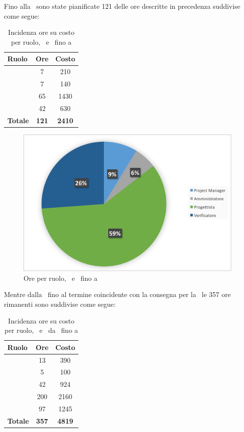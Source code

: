 \newpage
Fino alla \RP\ sono state pianificate 121 delle ore descritte in precedenza suddivise come segue:
\begin{table}[h]
	\begin{center}
		\begin{tabular}{|l|c|c|}
			\hline
			\textbf{Ruolo}	& \textbf{Ore} &	\textbf{Costo}	\\
			\hline
			\Pm &	7 & 210\\
			\hline
			\Am	&	7 & 140\\
			\hline
			\Prog	&	65 & 1430\\
			\hline
			\Ver	&	42 & 630\\
			\hline
			\textbf{Totale} &	 \textbf{121}	&	\textbf{2410}\\
			\hline
		\end{tabular}
	\end{center}
	\caption{Incidenza ore su costo per ruolo, \PD\ e \COD\ fino a \RP}
\end{table}

\begin{figure}[H]
	\centering 
	\includegraphics[scale=0.7]{Immagini/GraficiTorteSezione6/PD.png}
	\caption{Ore per ruolo, \PD\ e \COD\ fino a \RP}
\end{figure}

\newpage
Mentre dalla \RP\ fino al termine coincidente con la consegna per la \RQ\ le 357 ore rimanenti sono suddivise come segue:

\begin{table}[h]
	\begin{center}
		\begin{tabular}{|l|c|c|}
			\hline
			\textbf{Ruolo}	& \textbf{Ore} &	\textbf{Costo}	\\
			\hline
			\Pm &	13 & 390\\
			\hline
			\Am	&	5 & 100\\
			\hline
			\Prog	&	42 & 924\\
			\hline
			\Progr	&	200 & 2160\\
			\hline
			\Ver	&	97 & 1245\\
			\hline
			\textbf{Totale} &	 \textbf{357}	&	\textbf{4819}\\
			\hline
		\end{tabular}
	\end{center}
	\caption{Incidenza ore su costo per ruolo, \PD\ e \COD\ da \RP\ fino a \RQ}
\end{table}

